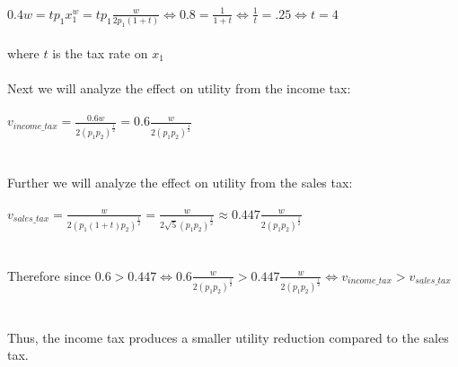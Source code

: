 \documentclass[12pt]{article}
\newenvironment{problem}[2][Problem]{\begin{trivlist}
\item[\hskip \labelsep {\bfseries #1}\hskip \labelsep {\bfseries #2.}]}{\end{trivlist}}
\newcommand\ddfrac[2]{\frac{\displaystyle #1}{\displaystyle #2}}
\begin{document}
\begin{problem}{3}
\\
\\
$0.4 w = tp_1 x_1^w =  tp_1 \ddfrac{w}{2 p_1(1+t)} \iff 0.8 = \ddfrac{1}{1+t}\iff \ddfrac{1}{t} = .25 \iff t = 4 $ \\
\\
where $ t $ is the tax rate on $x_1 $
\\
\\
Next we will analyze the effect on utility from the income tax:
\\
\\
$v_{income\_tax} = \ddfrac{0.6w}{2(p_1 p_2)^{\frac{1}{2}}} = 0.6 \ddfrac{w}{2(p_1 p_2)^{\frac{1}{2}}}$
\\
\\
\\
Further we will analyze the effect on utility from the sales tax:
\\
\\
$v_{sales\_tax} = \ddfrac{w}{2(p_1(1+t) p_2)^{\frac{1}{2}}} =  \ddfrac{w}{ 2\sqrt{5}(p_1 p_2)^{\frac{1}{2}}} \approx 0.447 \ddfrac{w}{2(p_1 p_2)^{\frac{1}{2}}}$
\\
\\
\\
Therefore since $0.6 >  0.447  \iff 0.6 \ddfrac{w}{2(p_1 p_2)^{\frac{1}{2}}}> 0.447 \ddfrac{w}{2(p_1 p_2)^{\frac{1}{2}}} \iff v_{income\_tax} > v_{sales\_tax}$
\\
\\
\\
Thus, the income tax produces a smaller utility reduction compared to the sales tax.
\end{problem}
\end{document}

